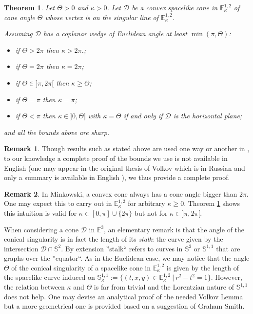 \documentclass[a4paper,12pt]{article}
\def\D{\mathcal{D}}
\def\E{\mathbf E}
\def\D{\mathcal{D}}
\def\E{\mathbb{E}}
\newcommand{\mass}[1]{{\mathbb E}^{1,2}_{#1}}
\def\SS{\mathbb{S}}
\def\Cone{\mathcal D}
\def\E{\mathbb{E}}
\def\D{\mathcal{D}}
\newtheorem{theo}{Theorem}	%
\theoremstyle{definition}
\newtheorem*{rem}{Remark}			 %
\begin{document}
				\begin{theo}\label{theo:volkov_lorentz} Let $\Theta>0$ and $\kappa>0$. Let $\Cone$ be a convex spacelike cone in $\mass{\kappa}$ of cone angle $\Theta$ whose vertex is on the singular line of $\mass{\kappa}$. 
					
					 Assuming $\Cone$ has a coplanar wedge of Euclidean angle at least $\min(\pi,\Theta)$:

					\begin{itemize}
					 \item if $\Theta> 2\pi$ then $\kappa > 2\pi$.;
					 \item if $\Theta = 2\pi$ then $\kappa = 2\pi
					 $;
					 \item if $\Theta\in ]\pi,2\pi[$ then $\kappa \geq \Theta$;
					 \item if $\Theta = \pi$ then $\kappa = \pi$;
					 \item if $\Theta<\pi$ then $\kappa\in ]0,\Theta]$ with $\kappa=\Theta$ if and only if $\Cone$ is the horizontal plane;
					\end{itemize}
					and all the bounds above are sharp.
					\end{theo}
                \begin{rem}
                 Though results such as stated above are used one way or another in \cite{MR2127379,MR2410380,MR2453328,MR2469522,MR2813423,milka1996space}, to our knowledge a complete proof of the bounds we use is not available in English (one may appear in the original thesis of Volkov which is in Russian and only a summary is available in English \cite{MR3904042}), we thus provide a complete proof. 
                \end{rem}               

					
				\begin{rem} In Minkowski, a convex cone always has a cone angle bigger than $2\pi$. One may expect this to carry out in $\mass{\kappa}$ for arbitrary $\kappa\geq0$. Theorem \ref{theo:volkov_lorentz} shows this intuition is valid for $\kappa \in [0,\pi]\cup\{2\pi\}$ but not for $\kappa\in ]\pi,2\pi[$.			 
				\end{rem}

                    When considering a cone $\mathcal D$ in $\E^3$, an elementary remark is that the angle of the conical singularity is in fact the length of its {\it stalk}: the curve given by the intersection $\D\cap \SS^2$. By extension ''stalk`` refers to curves in $\SS^{2}$ or $\SS^{1,1}$ that are graphs over the ''equator``. 
					As in the Euclidean case, we may notice that the angle $\Theta$ of the conical singularity of a spacelike cone in $\mass{\kappa}$ is given by the length of the spacelike curve induced on $\SS^{1,1}_\kappa:=\{(t,x,y) \in \mass{\kappa}~|~ r^2-t^2=1\}$. However, the relation between $\kappa$ and $\Theta$  is far from trivial and the Lorentzian nature of $\SS^{1,1}$ does not help. One may devise an analytical proof of the needed Volkov Lemma \cite{thesis} but a more geometrical one is provided based on a suggestion of Graham Smith. 
					
\end{document}

